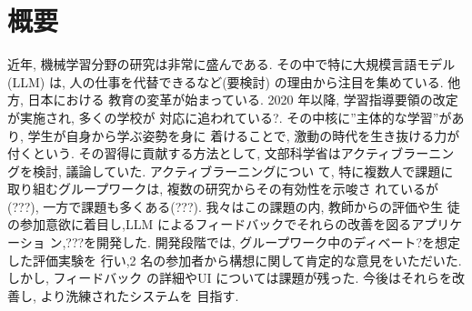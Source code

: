 \chapter{概要}
近年, 機械学習分野の研究は非常に盛んである. その中で特に大規模言語モデル(LLM)
は, 人の仕事を代替できるなど(要検討) の理由から注目を集めている. 他方, 日本における
教育の変革が始まっている. 2020 年以降, 学習指導要領の改定が実施され, 多くの学校が
対応に追われている?. その中核に”主体的な学習”があり, 学生が自身から学ぶ姿勢を身に
着けることで, 激動の時代を生き抜ける力が付くという. その習得に貢献する方法として,
文部科学省はアクティブラーニングを検討, 議論していた. アクティブラーニングについ
て, 特に複数人で課題に取り組むグループワークは, 複数の研究からその有効性を示唆さ
れているが(???), 一方で課題も多くある(???). 我々はこの課題の内, 教師からの評価や生
徒の参加意欲に着目し,LLM によるフィードバックでそれらの改善を図るアプリケーショ
ン,???を開発した. 開発段階では, グループワーク中のディベート?を想定した評価実験を
行い,2 名の参加者から構想に関して肯定的な意見をいただいた. しかし, フィードバック
の詳細やUI については課題が残った. 今後はそれらを改善し, より洗練されたシステムを
目指す.